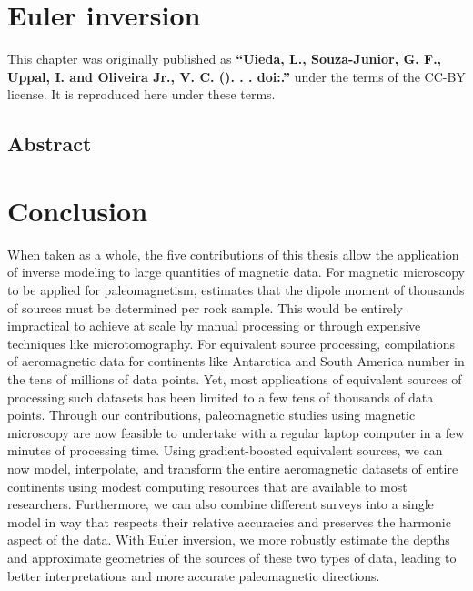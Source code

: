 \documentclass[10pt,a4paper,oneside]{book}
\begin{document}
% 
\endgroup

\chapter{Euler inversion}
\label{chap_euler}

\begingroup



\begin{summarybox}
    \noindent
    This chapter was originally published as
    \textbf{``Uieda, L., Souza-Junior, G. F., Uppal, I. and Oliveira Jr., V. C.
    (\Year). \Title{}. \textit{\Journal{}}.
    doi:\href{https://doi.org/\JournalDOI}{\JournalDOI}.''} under the
    terms of the CC-BY license. It is reproduced here under these terms.
\end{summarybox}

\section*{Abstract}


% 
\endgroup

\chapter{Conclusion}

When taken as a whole, the five contributions of this thesis allow the
application of inverse modeling to large quantities of magnetic data.
For magnetic microscopy to be applied for paleomagnetism, \citet{Bellon2025}
estimates that the dipole moment of thousands of sources must be determined per
rock sample.
This would be entirely impractical to achieve at scale by manual processing or
through expensive techniques like microtomography.
For equivalent source processing, compilations of aeromagnetic data for
continents like Antarctica and South America number in the tens of millions of
data points.
Yet, most applications of equivalent sources of processing such datasets has
been limited to a few tens of thousands of data points.
Through our contributions, paleomagnetic studies using magnetic microscopy are
now feasible to undertake with a regular laptop computer in a few minutes of
processing time.
Using gradient-boosted equivalent sources, we can now model, interpolate, and
transform the entire aeromagnetic datasets of entire continents using modest
computing resources that are available to most researchers.
Furthermore, we can also combine different surveys into a single model in way
that respects their relative accuracies and preserves the harmonic aspect of
the data.
With Euler inversion, we more robustly estimate the depths and approximate
geometries of the sources of these two types of data, leading to better
interpretations and more accurate paleomagnetic directions.
\end{document}
